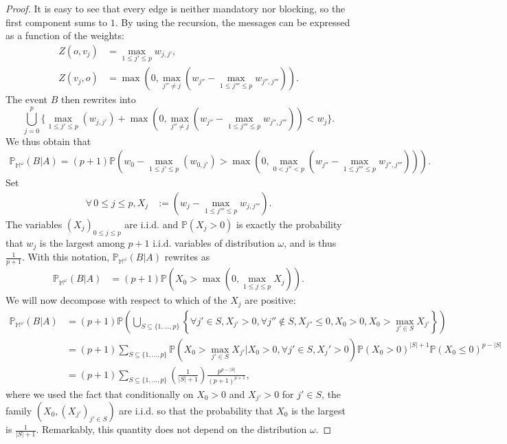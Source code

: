 \documentclass[11pt]{article}
\begin{document}
\begin{proof}
    It is easy to see that every edge is neither mandatory nor blocking, so the first component sums to $1$.
    By using the recursion, the messages can be expressed as a function of the weights:
    \begin{align*}
        Z(o,v_j)&= \max_{1 \leq j'\leq p} w_{j,j'}  ,\\
        Z(v_j,o) &=  \max \left(0, \max_{j'' \neq j} (w_{j''}-\max_{1\leq j''' \leq p} w_{j'',j'''}) \right). 
    \end{align*}
    The event $B$ then rewrites into
    \[  \bigcup_{j=0}^{p} \bigg\{ \max_{1\leq j'\leq p}(w_{j,j'})+\max(0, \max_{j''\neq j} (w_{j''}-\max_{1\leq j'''\leq p} w_{j'',j'''} ))  < w_j   \bigg \}.  \]
    We thus obtain that
    \begin{align*}
        \mathbb{P}_{\mathbb{M}^{\omega}}(B|A)=(p+1)\mathbb{P}\left(w_0-  \max_{1\leq j'\leq p}(w_{0,j'}) >\max(0, \max_{0<j''<p} (w_{j''}-\max_{1\leq j'''\leq p} w_{j'',j'''} ))\right).
    \end{align*}
    Set 
    \begin{align*}
       \forall \, 0\leq j\leq p, X_j&:= (w_{j}-\max_{1\leq j'''\leq p} w_{j,j'''} ).
    \end{align*}
    The variables $(X_j)_{0 \leq j \leq p}$ are i.i.d. and $\mathbb{P}(X_j>0)$ is exactly the probability that $w_j$ is the largest among $p+1$ i.i.d. variables of distribution $\omega$, and is thus $\tfrac{1}{p+1}$. With this notation, $\mathbb{P}_{\mathbb{M}^{\omega}}(B|A)$ rewrites as
    \begin{align*}
     \mathbb{P}_{\mathbb{M}^{\omega}}(B|A)&=(p+1)\mathbb{P}\left(  X_0 > \max(0,\max_{1\leq j \leq p} X_j) \right) .
     \end{align*}
     We will now decompose with respect to which of the $X_j$ are positive:
     \begin{align*}
     \mathbb{P}_{\mathbb{M}^{\omega}}(B|A)&=(p+1)\mathbb{P}\left(\bigcup_{S \subseteq \{1,\dots,p\}} \left\{ \forall j' \in S, X_{j'}>0, \forall j'' \notin S, X_{j''} \leq 0 , X_0>0, X_0>\max_{j' \in S} X_{j'} \right\} \right) \\
     &=(p+1)\sum_{S \subseteq \{1,\dots,p\}} \mathbb{P}\left(X_0 > \max_{j' \in S} X_{j'} | X_0>0, \forall j' \in S, X_j'>0 \right) \mathbb{P}(X_0>0)^{|S|+1}\mathbb{P}(X_0\leq 0)^{p-|S|} \\
     &= (p+1) \sum_{S \subseteq \{1,\dots,p\}} \left( \frac{1}{|S|+1} \right) \frac{p^{p-|S|}}{(p+1)^{p+1}},
     \end{align*}
    where we used the fact that conditionally on $X_0>0$ and  $X_{j'}>0$ for $j' \in S$, the family $(X_0, (X_{j'})_{j' \in S})$ are i.i.d. so that the probability that $X_0$ is the largest is $\tfrac{1}{|S|+1}$. Remarkably, this quantity does not depend on the distribution $\omega$.

\end{proof}
\end{document}
